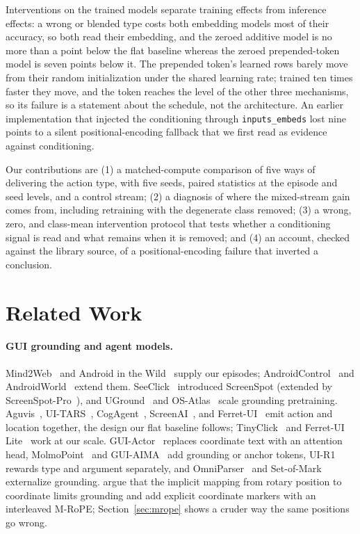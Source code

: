 \documentclass{article}
\begin{document}
Interventions on the trained models separate training effects from inference effects: a wrong or blended type costs both embedding models most of their accuracy, so both read their embedding, and the zeroed additive model is no more than a point below the flat baseline whereas the zeroed prepended-token model is seven points below it. The prepended token's learned rows barely move from their random initialization under the shared learning rate; trained ten times faster they move, and the token reaches the level of the other three mechanisms, so its failure is a statement about the schedule, not the architecture. An earlier implementation that injected the conditioning through \texttt{inputs\_embeds} lost nine points to a silent positional-encoding fallback that we first read as evidence against conditioning.

Our contributions are (1) a matched-compute comparison of five ways of delivering the action type, with five seeds, paired statistics at the episode and seed levels, and a control stream; (2) a diagnosis of where the mixed-stream gain comes from, including retraining with the degenerate class removed; (3) a wrong, zero, and class-mean intervention protocol that tests whether a conditioning signal is read and what remains when it is removed; and (4) an account, checked against the library source, of a positional-encoding failure that inverted a conclusion.

\section{Related Work}
\label{sec:related}

\paragraph{GUI grounding and agent models.}
Mind2Web~\citep{mind2web} and Android in the Wild~\citep{aitw} supply our episodes; AndroidControl~\citep{androidcontrol} and AndroidWorld~\citep{androidworld} extend them. SeeClick~\citep{seeclick} introduced ScreenSpot (extended by ScreenSpot-Pro~\citep{screenspotpro}), and UGround~\citep{uground} and OS-Atlas~\citep{osatlas} scale grounding pretraining. Aguvis~\citep{aguvis}, UI-TARS~\citep{uitars}, CogAgent~\citep{cogagent}, ScreenAI~\citep{screenai}, and Ferret-UI~\citep{ferretui} emit action and location together, the design our flat baseline follows; TinyClick~\citep{tinyclick} and Ferret-UI Lite~\citep{ferretuilite} work at our scale. GUI-Actor~\citep{guiactor} replaces coordinate text with an attention head, MolmoPoint~\citep{molmopoint} and GUI-AIMA~\citep{guiaima} add grounding or anchor tokens, UI-R1~\citep{uir1} rewards type and argument separately, and OmniParser~\citep{omniparser} and Set-of-Mark~\citep{som} externalize grounding. \citet{imrope} argue that the implicit mapping from rotary position to coordinate limits grounding and add explicit coordinate markers with an interleaved M-RoPE; Section~\ref{sec:mrope} shows a cruder way the same positions go wrong.
\end{document}
